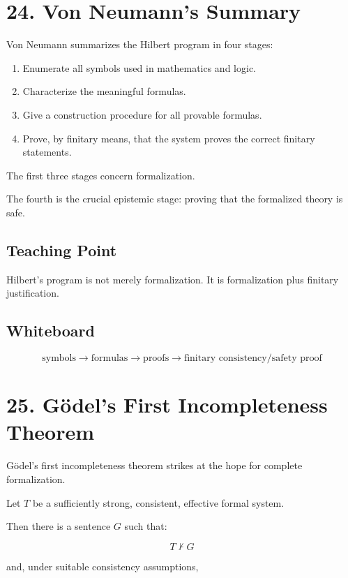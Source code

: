 \documentclass[11pt]{article}
\begin{document}
\section*{24. Von Neumann's Summary}

Von Neumann summarizes the Hilbert program in four stages:

\begin{enumerate}[leftmargin=2em]
    \item Enumerate all symbols used in mathematics and logic.
    \item Characterize the meaningful formulas.
    \item Give a construction procedure for all provable formulas.
    \item Prove, by finitary means, that the system proves the correct finitary statements.
\end{enumerate}

The first three stages concern formalization.

The fourth is the crucial epistemic stage: proving that the formalized theory is safe.

\subsection*{Teaching Point}

Hilbert's program is not merely formalization. It is formalization plus finitary justification.

\subsection*{Whiteboard}

\[
\text{symbols}
\rightarrow
\text{formulas}
\rightarrow
\text{proofs}
\rightarrow
\text{finitary consistency/safety proof}
\]

\section*{25. G\"odel's First Incompleteness Theorem}

G\"odel's first incompleteness theorem strikes at the hope for complete formalization.

Let \(T\) be a sufficiently strong, consistent, effective formal system.

Then there is a sentence \(G\) such that:

\[
T \nvdash G
\]

and, under suitable consistency assumptions,
\end{document}

